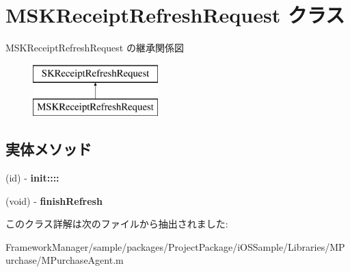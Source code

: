 \hypertarget{interface_m_s_k_receipt_refresh_request}{}\section{M\+S\+K\+Receipt\+Refresh\+Request クラス}
\label{interface_m_s_k_receipt_refresh_request}
M\+S\+K\+Receipt\+Refresh\+Request の継承関係図\begin{figure}[H]
\begin{center}
\leavevmode
\includegraphics[height=2.000000cm]{interface_m_s_k_receipt_refresh_request}
\end{center}
\end{figure}
\subsection*{実体メソッド}
\begin{DoxyCompactItemize}
\item 
\hypertarget{interface_m_s_k_receipt_refresh_request_a261342f85ca8ac9bb6bdd3b92576720d}{}(id) -\/ {\bfseries init\+::::}\label{interface_m_s_k_receipt_refresh_request_a261342f85ca8ac9bb6bdd3b92576720d}

\item 
\hypertarget{interface_m_s_k_receipt_refresh_request_a171f83da8c228c15b54cb844e75ecc81}{}(void) -\/ {\bfseries finish\+Refresh}\label{interface_m_s_k_receipt_refresh_request_a171f83da8c228c15b54cb844e75ecc81}

\end{DoxyCompactItemize}


このクラス詳解は次のファイルから抽出されました\+:\begin{DoxyCompactItemize}
\item 
Framework\+Manager/sample/packages/\+Project\+Package/i\+O\+S\+Sample/\+Libraries/\+M\+Purchase/M\+Purchase\+Agent.\+m\end{DoxyCompactItemize}
